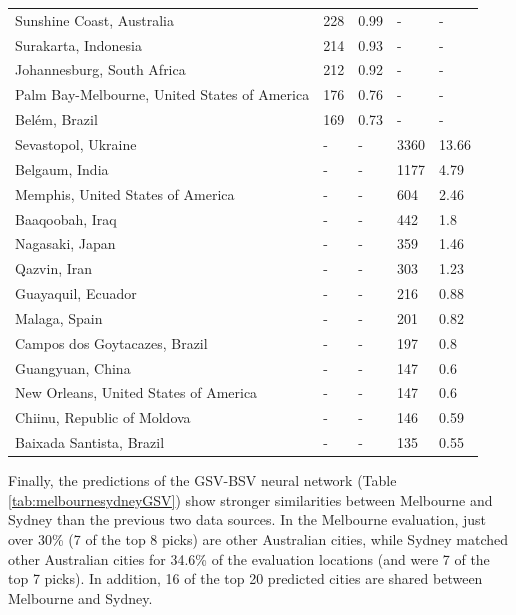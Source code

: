 \documentclass[sageh,times]{sagej}
\begin{document}
\begin{table}[!htbp]
\begin{tabular}{ l  l l l  l}
Sunshine Coast, Australia & 228 & 0.99 &-&- \\ 
Surakarta, Indonesia & 214 & 0.93 &-&- \\ 
Johannesburg, South Africa & 212 & 0.92 &-&- \\ 
Palm Bay-Melbourne, United States of America & 176 & 0.76 &-&- \\ 
Bel\'{e}m, Brazil & 169 & 0.73 &-&- \\ 
Sevastopol, Ukraine &-&- & 3360 & 13.66\\ 
Belgaum, India &-&- & 1177 & 4.79\\ 
Memphis, United States of America &-&- & 604 & 2.46\\ 
Baaqoobah, Iraq &-&- & 442 & 1.8\\ 
Nagasaki, Japan &-&- & 359 & 1.46\\ 
Qazvin, Iran &-&- & 303 & 1.23\\ 
Guayaquil, Ecuador &-&- & 216 & 0.88\\ 
Malaga, Spain &-&- & 201 & 0.82\\ 
Campos dos Goytacazes, Brazil &-&- & 197 & 0.8\\ 
Guangyuan, China &-&- & 147 & 0.6\\ 
New Orleans, United States of America &-&- & 147 & 0.6\\ 
Chiinu, Republic of Moldova &-&- & 146 & 0.59\\ 
Baixada Santista, Brazil &-&- & 135 & 0.55\\ \hline
\end{tabular}
\end{table}

Finally, the predictions of the GSV-BSV neural network (Table \ref{tab:melbournesydneyGSV}) show stronger similarities between Melbourne and Sydney than the previous two data sources. In the Melbourne evaluation, just over 30\% (7 of the top 8 picks) are other Australian cities, while Sydney matched other Australian cities for 34.6\% of the evaluation locations (and were 7 of the top 7 picks). In addition, 16 of the top 20 predicted cities are shared between Melbourne and Sydney. 
\end{document}
